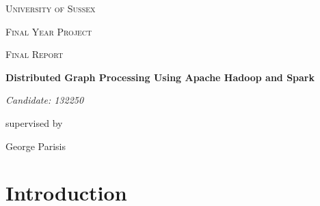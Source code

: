 \documentclass{article}
\begin{document}



\begin{titlepage}

	\centering
	{\scshape\LARGE University of Sussex \par}
	{\scshape\LARGE Final Year Project \par}
	\vspace{1cm}
	{\scshape\Large Final Report\par}
	\vspace{1.5cm}
	{\huge\bfseries Distributed Graph Processing Using Apache Hadoop and Spark\par}
	\vspace{2cm}
	{\Large\itshape Candidate: 132250\par}
	\vfill
	supervised by\par
	George Parisis

	\vfill
\end{titlepage}


\tableofcontents

\newpage
\section{Introduction}
\end{document}
